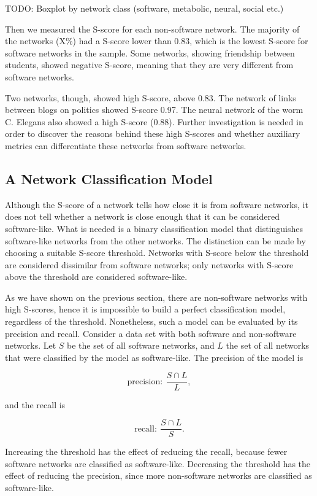 TODO: Boxplot by network class (software, metabolic, neural, social etc.)

Then we measured the S-score for each non-software network. The majority of the
networks (X\%) had a S-score lower than 0.83, which is the lowest S-score for
software networks in the sample. Some networks, showing friendship between
students, showed negative S-score, meaning that they are very different from
software networks.

Two networks, though, showed high S-score, above 0.83. The network of links
between blogs on politics showed S-score 0.97. The neural network of the worm
C. Elegans also showed a high S-score (0.88). Further investigation is needed
in order to discover the reasons behind these high S-scores and whether
auxiliary metrics can differentiate these networks from software networks.

\subsection{A Network Classification Model} \label{sec:classmodel}

Although the S-score of a network tells how close it is from software networks,
it does not tell whether a network is close enough that it can be considered
software-like. What is needed is a binary classification model that
distinguishes software-like networks from the other networks. The distinction
can be made by choosing a suitable S-score threshold. Networks with S-score
below the threshold are considered dissimilar from software networks; only
networks with S-score above the threshold are considered software-like. 

As we have shown on the previous section, there are non-software networks with
high S-scores, hence it is impossible to build a perfect classification model,
regardless of the threshold. Nonetheless, such a model can be evaluated by its
precision and recall. Consider a data set with both software and non-software
networks. Let $S$ be the set of all software networks, and $L$ the set of all
networks that were classified by the model as software-like. The precision of
the model is

$$
\mathrm{precision}: ~\frac{S \cap L}{L},
$$

and the recall is

$$
\mathrm{recall}: ~\frac{S \cap L}{S}.
$$

Increasing the threshold has the effect of reducing the recall, because fewer
software networks are classified as software-like. Decreasing the threshold has
the effect of reducing the precision, since more non-software networks are
classified as software-like. 

